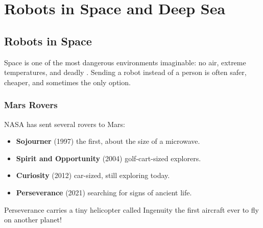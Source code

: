 
\chapter{Robots in Space and Deep Sea}


\section*{Robots in Space}

Space is one of the most dangerous environments imaginable: no air, extreme
temperatures, and deadly . Sending a robot instead of a person
is often safer, cheaper, and sometimes the only option.


\subsection*{Mars Rovers}

NASA has sent several rovers to Mars:
\begin{itemize}
  \item \textbf{Sojourner} (1997) \textemdash{} the first, about the size of a microwave.
  \item \textbf{Spirit and Opportunity} (2004) \textemdash{} golf-cart-sized explorers.
  \item \textbf{Curiosity} (2012) \textemdash{} car-sized, still exploring today.
  \item \textbf{Perseverance} (2021) \textemdash{} searching for signs of ancient life.
\end{itemize}

\begin{funfact}
  Perseverance carries a tiny helicopter called Ingenuity \textemdash{}
  the first aircraft ever to fly on another planet!
\end{funfact}


